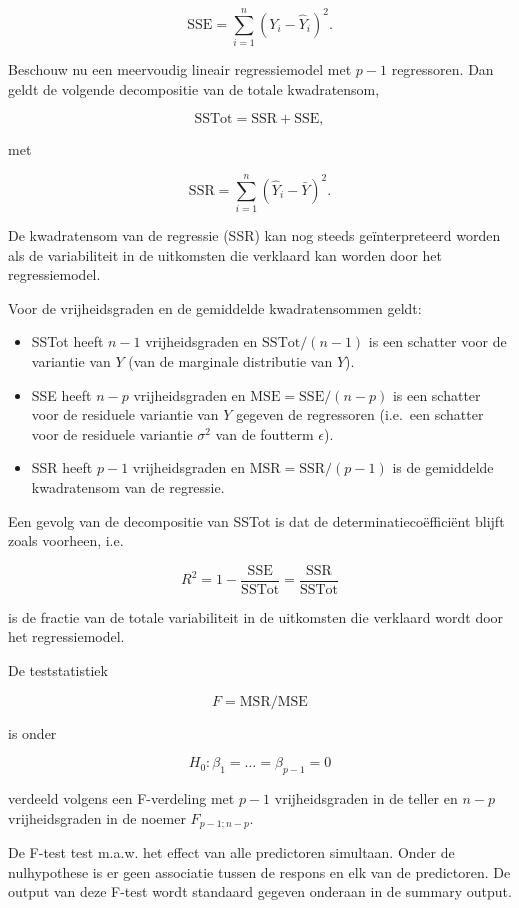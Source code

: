 \documentclass[
  12pt,dutch,coursenotes]{book}
\providecommand{\tightlist}{%
  \setlength{\itemsep}{0pt}\setlength{\parskip}{0pt}}
\theoremstyle{definition}
\theoremstyle{definition}
\theoremstyle{definition}
\theoremstyle{remark}
\begin{document}
\[
  \text{SSE} = \sum_{i=1}^n (Y_i-\hat{Y}_i)^2.
\]

Beschouw nu een meervoudig lineair regressiemodel met \(p-1\) regressoren. Dan geldt de volgende decompositie van de totale kwadratensom,

\[
  \text{SSTot} = \text{SSR} + \text{SSE} ,
\]

met

\[
  \text{SSR} = \sum_{i=1}^n (\hat{Y}_i-\bar{Y})^2.
\]

De kwadratensom van de regressie (SSR) kan nog steeds geïnterpreteerd worden als de variabiliteit in de uitkomsten die verklaard kan worden door het regressiemodel.

Voor de vrijheidsgraden en de gemiddelde kwadratensommen geldt:

\begin{itemize}
\tightlist
\item
  SSTot heeft \(n-1\) vrijheidsgraden en \(\text{SSTot}/(n-1)\) is een schatter voor de variantie van \(Y\) (van de marginale distributie van \(Y\)).
\item
  SSE heeft \(n-p\) vrijheidsgraden en \(\text{MSE}=\text{SSE}/(n-p)\) is een schatter voor de residuele variantie van \(Y\) gegeven de regressoren (i.e.~een schatter voor de residuele variantie \(\sigma^2\) van de foutterm \(\epsilon\)).
\item
  SSR heeft \(p-1\) vrijheidsgraden en \(\text{MSR}=\text{SSR}/(p-1)\) is de gemiddelde kwadratensom van de regressie.
\end{itemize}

Een gevolg van de decompositie van SSTot is dat de determinatiecoëfficiënt blijft zoals voorheen, i.e.

\[
  R^2 = 1-\frac{\text{SSE}}{\text{SSTot}} = \frac{\text{SSR}}{\text{SSTot}}
\]

is de fractie van de totale variabiliteit in de uitkomsten die verklaard wordt door het regressiemodel.

De teststatistiek

\[
F=\text{MSR}/\text{MSE}
\]

is onder

\[H_0:\beta_1=\ldots=\beta_{p-1}=0\]

verdeeld volgens een F-verdeling met \(p-1\) vrijheidsgraden in de teller en \(n-p\) vrijheidsgraden in de noemer \(F_{p-1;n-p}\).

De F-test test m.a.w. het effect van alle predictoren simultaan. Onder de nulhypothese is er geen associatie tussen de respons en elk van de predictoren. De output van deze F-test wordt standaard gegeven onderaan in de summary output.
\end{document}
